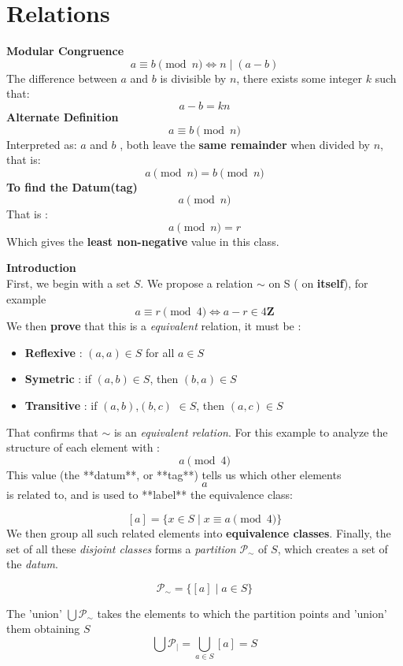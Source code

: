 \documentclass[12pt]{article}
\begin{document}
	
	\section*{Relations}
	
	\begin{minipage}[t]{0.4\textwidth}
		\textbf{Modular Congruence}
		\vspace{0.3cm}
		$$a \equiv b \pmod{n} \iff n \mid (a - b)$$
		 The difference between $a$ and $b$ is divisible by $n$, there exists some integer $k$ such that:$$ a - b = kn$$
		 \textbf{Alternate Definition}
		 $$a \equiv b \pmod{n}$$
		 Interpreted as:  $a$ and $b$ , both leave the \textbf{same remainder} when divided by $n$, that is: $$a \pmod{n} = b \pmod{n}$$
		 \textbf{To find the Datum(tag)}
		 $$a \pmod n$$
		 That is : $$a \pmod n = r$$
		 Which gives the \textbf{least non-negative} value in this class.
		 
		 
	\end{minipage}
	\hfill
	\begin{minipage}[t]{0.58\textwidth}
		\textbf{Introduction}
		\vspace{0.3cm}\\
First, we begin with a set $S$. We propose a relation $\sim$ on S ( on \textbf{itself}), for example 
$$a\equiv r \pmod{4} \iff a-r \in 4 \mathbf{Z}$$
We then \textbf{prove} that this is a \textit{equivalent} relation, it must be :
\begin{itemize}
	\item \textbf{Reflexive} : $(a,a) \in S$ for all $a \in S$
	\item \textbf{Symetric} : if $(a,b) \in S$, then $(b,a) \in S$ 
	\item \textbf{Transitive} : if $(a,b)$,$(b,c)$ $\in S$, then $(a,c) \in S$
\end{itemize}
\vspace{0.3cm}
That confirms that $\sim$ is an \textit{equivalent relation}. For this example to analyze the structure of each element with : $$a \pmod{4}$$
This value (the **datum**, or **tag**) tells us which other elements $$a$$is related to, and is used to **label** the equivalence class:

$$
[a] = \{ x \in S \mid x \equiv a \pmod 4 \}
$$
We then group all such related elements into \textbf{equivalence classes}. Finally, the set of all these \textit{disjoint classes} forms a \textit{partition} $\mathcal{P}_\sim$ of $S$, which creates a set of the \textit{datum}.

$$\mathcal{P}_\sim = \{[a] \mid a \in S\}$$

The 'union' $\bigcup \mathcal{P}_\sim$ takes the elements to which the partition points and 'union' them obtaining $S$
$$\bigcup \mathcal{P}_\mid = \bigcup_{a \in S} [a] = S$$
		
	\end{minipage}
	
\end{document}
